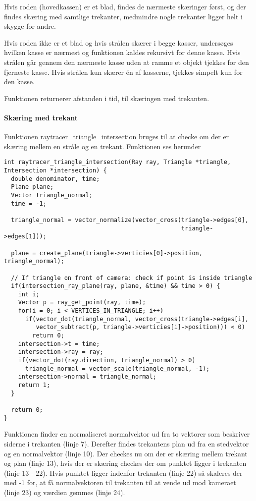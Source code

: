 Hvis roden (hovedkassen) er et blad, findes de nærmeste skæringer først, og der findes skæring med samtlige trekanter, medmindre nogle trekanter ligger helt i skygge for andre.

Hvis roden ikke er et blad og hvis strålen skærer i begge kasser, undersøges hvilken kasse er nærmest og funktionen kaldes rekursivt for denne kasse. Hvis strålen går gennem den nærmeste kasse uden at ramme et objekt tjekkes for den fjerneste kasse. Hvis strålen kun skærer én af kasserne, tjekkes simpelt kun for den kasse.

Funktionen returnerer afstanden i tid, til skæringen med trekanten.

\paragraph{Skæring med trekant}

Funktionen raytracer\_triangle\_intersection bruges til at checke om der er skæring mellem en stråle og en trekant. Funktionen ses herunder

\begin{lstlisting}[style=Cstyle, caption=Funktionen der finder skæring med trekant]
int raytracer_triangle_intersection(Ray ray, Triangle *triangle, Intersection *intersection) {
  double denominator, time;
  Plane plane;
  Vector triangle_normal;
  time = -1;

  triangle_normal = vector_normalize(vector_cross(triangle->edges[0], 
                                                  triangle->edges[1]));

  plane = create_plane(triangle->verticies[0]->position, triangle_normal);

  // If triangle on front of camera: check if point is inside triangle
  if(intersection_ray_plane(ray, plane, &time) && time > 0) {
    int i;
    Vector p = ray_get_point(ray, time);
    for(i = 0; i < VERTICES_IN_TRIANGLE; i++)
      if(vector_dot(triangle_normal, vector_cross(triangle->edges[i], 
         vector_subtract(p, triangle->verticies[i]->position))) < 0)
        return 0;
    intersection->t = time;
    intersection->ray = ray;
    if(vector_dot(ray.direction, triangle_normal) > 0)
      triangle_normal = vector_scale(triangle_normal, -1);
    intersection->normal = triangle_normal;
    return 1;
  }

  return 0;
}
\end{lstlisting}

Funktionen finder en normaliseret normalvektor ud fra to vektorer som beskriver siderne i trekanten (linje 7). Derefter findes trekantens plan ud fra en stedvektor og en normalvektor (linje 10). Der checkes nu om der er skæring mellem trekant og plan (linje 13), hvis der er skæring checkes der om punktet ligger i trekanten (linje 13 - 22). Hvis punktet ligger indenfor trekanten (linje 22) så skaleres der med -1 for, at få normalvektoren til trekanten til at vende ud mod kameraet (linje 23) og værdien gemmes (linje 24).

